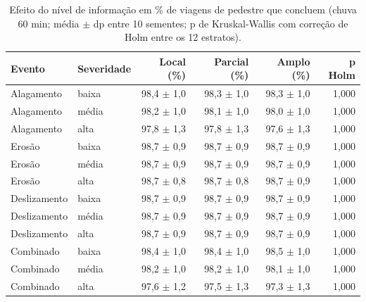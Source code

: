 \begin{table}[htbp]
\centering
\scriptsize
\caption{Efeito do nível de informação em \% de viagens de pedestre que concluem (chuva 60 min; média $\pm$ dp entre 10 sementes; p de Kruskal-Wallis com correção de Holm entre os 12 estratos).}
\label{tab:t2_pedestre}
\begin{tabular}{llrrrr}
\toprule
Evento & Severidade & Local (\%) & Parcial (\%) & Amplo (\%) & p Holm \\
\midrule
Alagamento & baixa & 98,4 $\pm$ 1,0 & 98,3 $\pm$ 1,0 & 98,3 $\pm$ 1,0 & 1,000 \\
Alagamento & média & 98,2 $\pm$ 1,0 & 98,1 $\pm$ 1,0 & 98,0 $\pm$ 1,0 & 1,000 \\
Alagamento & alta & 97,8 $\pm$ 1,3 & 97,8 $\pm$ 1,3 & 97,6 $\pm$ 1,3 & 1,000 \\
Erosão & baixa & 98,7 $\pm$ 0,9 & 98,7 $\pm$ 0,9 & 98,7 $\pm$ 0,9 & 1,000 \\
Erosão & média & 98,7 $\pm$ 0,9 & 98,7 $\pm$ 0,9 & 98,7 $\pm$ 0,9 & 1,000 \\
Erosão & alta & 98,7 $\pm$ 0,8 & 98,7 $\pm$ 0,8 & 98,7 $\pm$ 0,9 & 1,000 \\
Deslizamento & baixa & 98,7 $\pm$ 0,9 & 98,7 $\pm$ 0,9 & 98,7 $\pm$ 0,9 & 1,000 \\
Deslizamento & média & 98,7 $\pm$ 0,9 & 98,7 $\pm$ 0,9 & 98,7 $\pm$ 0,9 & 1,000 \\
Deslizamento & alta & 98,7 $\pm$ 0,9 & 98,7 $\pm$ 0,9 & 98,7 $\pm$ 0,9 & 1,000 \\
Combinado & baixa & 98,4 $\pm$ 1,0 & 98,4 $\pm$ 1,0 & 98,5 $\pm$ 1,0 & 1,000 \\
Combinado & média & 98,2 $\pm$ 1,0 & 98,2 $\pm$ 1,0 & 98,1 $\pm$ 1,0 & 1,000 \\
Combinado & alta & 97,6 $\pm$ 1,2 & 97,5 $\pm$ 1,3 & 97,3 $\pm$ 1,3 & 1,000 \\
\bottomrule
\end{tabular}
\end{table}
